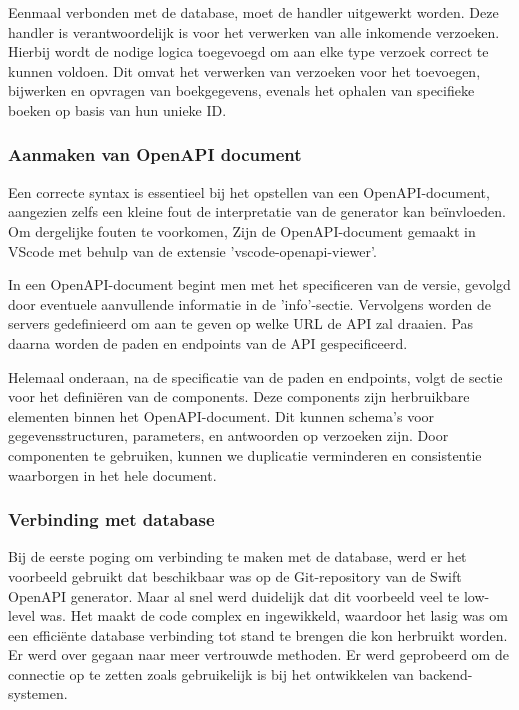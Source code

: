 Eenmaal verbonden met de database, moet de handler uitgewerkt worden. Deze handler is verantwoordelijk is voor het verwerken van alle inkomende verzoeken. Hierbij wordt de nodige logica toegevoegd om aan elke type verzoek correct te kunnen voldoen. Dit omvat het verwerken van verzoeken voor het toevoegen, bijwerken en opvragen van boekgegevens, evenals het ophalen van specifieke boeken op basis van hun unieke ID.


\subsubsection{Aanmaken van OpenAPI document}

Een correcte syntax is essentieel bij het opstellen van een OpenAPI-document, aangezien zelfs een kleine fout de interpretatie van de generator kan beïnvloeden. Om dergelijke fouten te voorkomen, Zijn de OpenAPI-document gemaakt in VScode met behulp van de extensie 'vscode-openapi-viewer'. 

In een OpenAPI-document begint men met het specificeren van de versie, gevolgd door eventuele aanvullende informatie in de 'info'-sectie. Vervolgens worden de servers gedefinieerd om aan te geven op welke URL de API zal draaien. Pas daarna worden de paden en endpoints van de API gespecificeerd.

Helemaal onderaan, na de specificatie van de paden en endpoints, volgt de sectie voor het definiëren van de components. Deze components zijn herbruikbare elementen binnen het OpenAPI-document. Dit kunnen schema's voor gegevensstructuren, parameters, en antwoorden op verzoeken zijn. Door componenten te gebruiken, kunnen we duplicatie verminderen en consistentie waarborgen in het hele document.

\subsubsection{Verbinding met database}

Bij de eerste poging om verbinding te maken met de database, werd er het voorbeeld gebruikt dat beschikbaar was op de Git-repository van de Swift OpenAPI generator. Maar al snel werd duidelijk dat dit voorbeeld veel te low-level was. Het maakt de code complex en ingewikkeld, waardoor het lasig was om een efficiënte database verbinding tot stand te brengen die kon herbruikt worden.  
Er werd over gegaan naar meer vertrouwde methoden. Er werd geprobeerd om de connectie op te zetten zoals gebruikelijk is bij het ontwikkelen van backend-systemen. 

